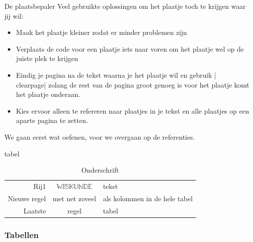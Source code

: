 \documentclass{cursuspresentatie}
\begin{document}
\begin{frame}[allowframebreaks]{De plaatsbepaler}
	Veel gebruikte oplossingen om het plaatje toch te krijgen waar jij wil:
	\begin{itemize}
		\item Maak het plaatje kleiner zodat er minder problemen zijn
		\item Verplaats de code voor een plaatje iets naar voren om het plaatje
		wel op de juiste plek te krijgen
		\item Eindig je pagina na de tekst waarna je het plaatje wil en gebruik
		\hll|\\clearpage| zolang de rest van de pagina groot
		genoeg is voor het plaatje komt het plaatje onderaan.
		\item Kies ervoor alleen te refereren naar plaatjes in je tekst en alle
		plaatjes op een aparte pagina te zetten.
	\end{itemize}
We gaan eerst wat oefenen, voor we overgaan op de referenties.
\end{frame}

\begin{saveblock}{tabel}
    \begin{highlightblock}
        \begin{table}
            \centering
            \begin{tabular}{||r|c|l||}%
                Rij1 & $\mathbb{WISKUNDE}$ & tekst\\
                Nieuwe regel & met net zoveel & als kolommen in
                de hele tabel\\
                \hline
                Laatste & regel & tabel
            \end{tabular}
            \caption{Onderschrift}
            \label{tab: tabel}
        \end{table}
    \end{highlightblock}
\end{saveblock}

\begin{frame}
	\frametitle{Tabellen}
\end{frame}
\end{document}
